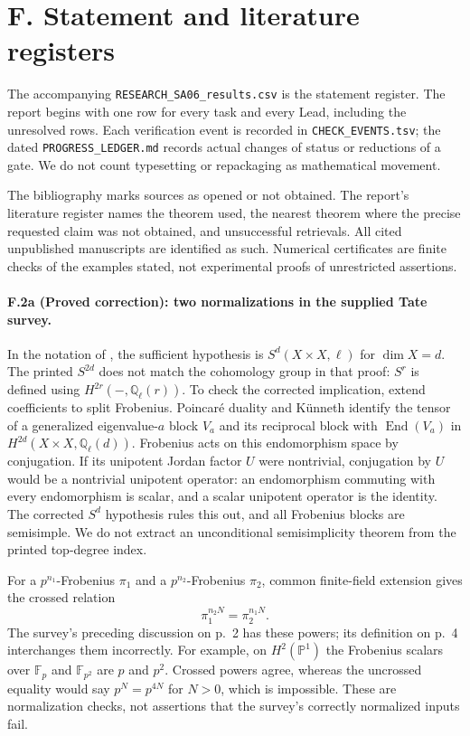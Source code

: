 \section{F. Statement and literature registers}
The accompanying \texttt{RESEARCH\_SA06\_results.csv} is the statement
register. The report begins with one row for every task and every Lead,
including the unresolved rows. Each verification event is recorded in
\texttt{CHECK\_EVENTS.tsv}; the dated \texttt{PROGRESS\_LEDGER.md} records
actual changes of status or reductions of a gate. We do not count
typesetting or repackaging as mathematical movement.

The bibliography marks sources as opened or not obtained. The report's
literature register names the theorem used, the nearest theorem where the
precise requested claim was not obtained, and unsuccessful retrievals.
All cited unpublished manuscripts are identified as such. Numerical
certificates are finite checks of the examples stated, not experimental
proofs of unrestricted assertions.

\paragraph{F.2a (Proved correction): two normalizations in the supplied Tate survey.}
In the notation of \citet[Theorem 1.6 and its proof, p.~3]{rootMilneTate2007},
the sufficient hypothesis is $S^d(X\times X,\ell)$ for $\dim X=d$.
The printed $S^{2d}$ does not match the cohomology group in that proof:
$S^r$ is defined using $H^{2r}(-,\mathbb Q_\ell(r))$.
To check the corrected implication, extend coefficients to split
Frobenius. Poincar\'e duality and K\"unneth identify the tensor of
a generalized eigenvalue-$a$ block $V_a$ and its reciprocal block
with $\operatorname{End}(V_a)$ in
$H^{2d}(X\times X,\mathbb Q_\ell(d))$.
Frobenius acts on this endomorphism space by conjugation. If its
unipotent Jordan factor $U$ were nontrivial, conjugation by $U$
would be a nontrivial unipotent operator: an endomorphism commuting
with every endomorphism is scalar, and a scalar unipotent operator
is the identity. The corrected $S^d$ hypothesis rules this out,
and all Frobenius blocks are semisimple. We do not extract an
unconditional semisimplicity theorem from the printed top-degree
index.

For a $p^{n_1}$-Frobenius $\pi_1$ and a $p^{n_2}$-Frobenius
$\pi_2$, common finite-field extension gives the crossed relation
\[
                    \pi_1^{n_2N}=\pi_2^{n_1N}.
\]
The survey's preceding discussion on p.~2 has these powers; its
definition on p.~4 interchanges them incorrectly. For example,
on $H^2(\mathbb P^1)$ the Frobenius scalars over $\mathbb F_p$
and $\mathbb F_{p^2}$ are $p$ and $p^2$. Crossed powers agree,
whereas the uncrossed equality would say $p^N=p^{4N}$ for
$N>0$, which is impossible. These are normalization checks,
not assertions that the survey's correctly normalized inputs fail.

